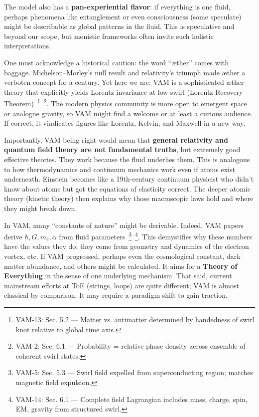 \documentclass[a4paper,12pt]{article}
\begin{document}
    The model also has a \textbf{pan-experiential flavor}: if everything is one fluid, perhaps phenomena like entanglement or even consciousness (some speculate) might be describable as global patterns in the fluid. This is speculative and beyond our scope, but monistic frameworks often invite such holistic interpretations.

    One must acknowledge a historical caution: the word “æther” comes with baggage. Michelson–Morley’s null result and relativity’s triumph made æther a verboten concept for a century. Yet here we are: VAM is a sophisticated æther theory that explicitly yields Lorentz invariance at low swirl (Lorentz Recovery Theorem)~\footnote{VAM-13: Sec. 5.2 — Matter vs. antimatter determined by handedness of swirl knot relative to global time axis.}~\footnote{VAM-2: Sec. 6.1 — Probability = relative phase density across ensemble of coherent swirl states.}. The modern physics community is more open to emergent space or analogue gravity, so VAM might find a welcome or at least a curious audience. If correct, it vindicates figures like Lorentz, Kelvin, and Maxwell in a new way.

    Importantly, VAM being right would mean that \textbf{general relativity and quantum field theory are not fundamental truths}, but extremely good effective theories. They work because the fluid underlies them. This is analogous to how thermodynamics and continuum mechanics work even if atoms exist underneath. Einstein becomes like a 19th-century continuum physicist who didn’t know about atoms but got the equations of elasticity correct. The deeper atomic theory (kinetic theory) then explains why those macroscopic laws hold and where they might break down.

    In VAM, many “constants of nature” might be derivable. Indeed, VAM papers derive $\hbar, G, m_e, \alpha$ from fluid parameters~\footnote{VAM-5: Sec. 5.3 — Swirl field expelled from superconducting region; matches magnetic field expulsion.}~\footnote{VAM-14: Sec. 6.1 — Complete field Lagrangian includes mass, charge, spin, EM, gravity from structured swirl.}. This demystifies why these numbers have the values they do: they come from geometry and dynamics of the electron vortex, etc. If VAM progressed, perhaps even the cosmological constant, dark matter abundance, and others might be calculated. It aims for a \textbf{Theory of Everything} in the sense of one underlying mechanism. That said, current mainstream efforts at ToE (strings, loops) are quite different; VAM is almost classical by comparison. It may require a paradigm shift to gain traction.
\end{document}
